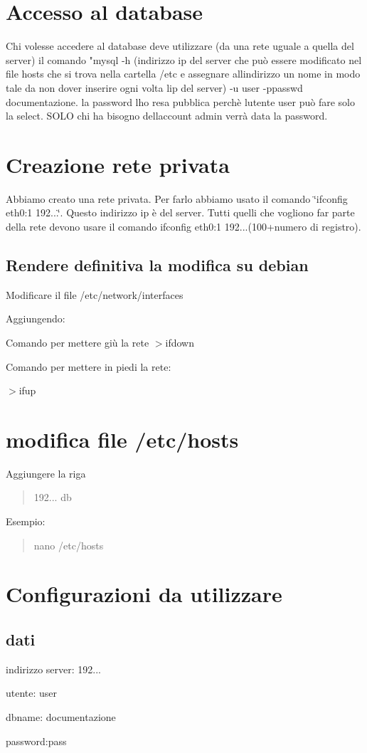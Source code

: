  \section*{Accesso al database}

Chi volesse accedere al database deve utilizzare (da una rete uguale a quella del server) il comando "mysql -\/h (indirizzo ip del server che può essere modificato nel file hosts che si trova nella cartella /etc e assegnare all\textquotesingle{}indirizzo un nome in modo tale da non dover inserire ogni volta l\textquotesingle{}ip del server) -\/u user -\/ppasswd documentazione. la password l\textquotesingle{}ho resa pubblica perchè l\textquotesingle{}utente user può fare solo la select. S\+O\+LO chi ha bisogno dell\textquotesingle{}account admin verrà data la password.

\section*{Creazione rete privata}

Abbiamo creato una rete privata. Per farlo abbiamo usato il comando \char`\"{}ifconfig eth0\+:1 192...\char`\"{}. Questo indirizzo ip è del server. Tutti quelli che vogliono far parte della rete devono usare il comando \textquotesingle{}ifconfig eth0\+:1 192...(100+numero di registro)\textquotesingle{}.

\subsection*{Rendere definitiva la modifica su debian}

Modificare il file /etc/network/interfaces

Aggiungendo\+: 
\begin{DoxyCode}{0}
\end{DoxyCode}
 Comando per mettere giù la rete $>$ifdown

Comando per mettere in piedi la rete\+:

$>$ifup \section*{modifica file /etc/hosts}

Aggiungere la riga

\begin{quote}
192... db \end{quote}
Esempio\+:

\begin{quote}
nano /etc/hosts \end{quote}


\section*{Configurazioni da utilizzare}

\subsection*{dati}

indirizzo server\+: 192...

utente\+: user

dbname\+: documentazione

password\+:pass 